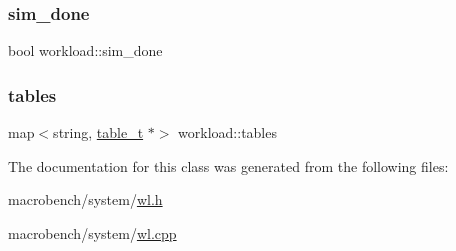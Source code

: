 \mbox{\label{classworkload_adebf7ae095ae33d23c7bdd5c30a13787}} 
\subsubsection{\texorpdfstring{sim\+\_\+done}{sim\_done}}
{\footnotesize\ttfamily bool workload\+::sim\+\_\+done}

\mbox{\label{classworkload_a35ca60eab63190c0667225df31555677}} 
\subsubsection{\texorpdfstring{tables}{tables}}
{\footnotesize\ttfamily map$<$string, \hyperlink{classtable__t}{table\+\_\+t} $\ast$$>$ workload\+::tables}



The documentation for this class was generated from the following files\+:\begin{DoxyCompactItemize}
\item 
macrobench/system/\hyperlink{wl_8h}{wl.\+h}\item 
macrobench/system/\hyperlink{wl_8cpp}{wl.\+cpp}\end{DoxyCompactItemize}
